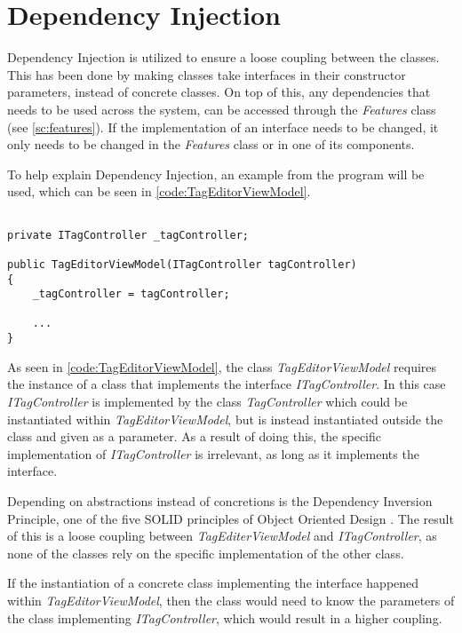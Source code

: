 \section{Dependency Injection} \label{sc:DependencyInjection}
Dependency Injection is utilized to ensure a loose coupling between the classes. This has been done by making classes take interfaces in their constructor parameters, instead of concrete classes. On top of this, any dependencies that needs to be used across the system, can be accessed through the \textit{Features} class (see \autoref{sc:features}). If the implementation of an interface needs to be changed, it only needs to be changed in the \textit{Features} class or in one of its components.
\par
To help explain Dependency Injection, an example from the program will be used, which can be seen in \autoref{code:TagEditorViewModel}.

\begin{listing}[H]
\begin{verbatim}

private ITagController _tagController;

public TagEditorViewModel(ITagController tagController)
{
    _tagController = tagController;
    
    ...
}

\end{verbatim}
\label{code:TagEditorViewModel}
\end{listing}

As seen in \autoref{code:TagEditorViewModel}, the class \textit{TagEditorViewModel} requires the instance of a class that implements the interface \textit{ITagController}. In this case \textit{ITagController} is implemented by the class \textit{TagController} which could be instantiated within \textit{TagEditorViewModel}, but is instead instantiated outside the class and given as a parameter. As a result of doing this, the specific implementation of \textit{ITagController} is irrelevant, as long as it implements the interface. 
\par
Depending on abstractions instead of concretions is the Dependency Inversion Principle, one of the five SOLID principles of Object Oriented Design \citep{AgilePPP}. The result of this is a loose coupling between \textit{TagEditerViewModel} and \textit{ITagController}, as none of the classes rely on the specific implementation of the other class.
\par
If the instantiation of a concrete class implementing the interface happened within \textit{TagEditorViewModel}, then the class would need to know the parameters of the class implementing \textit{ITagController}, which would result in a higher coupling.
\par

